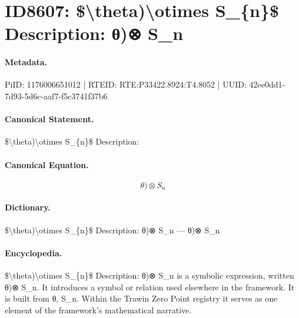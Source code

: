 \section*{ID8607: \$\textbackslash{}theta)\textbackslash{}otimes S\_\{n\}\$ Description: θ)⊗ S\_n}
\paragraph{Metadata.}
PiID: 1176006651012 | RTEID: RTE:P33422.8924:T4.8052 | UUID: 42ee0dd1-7d93-5d6c-aaf7-f5c3741f37b6

\paragraph{Canonical Statement.}
\$\textbackslash{}theta)\textbackslash{}otimes S\_\{n\}\$ Description:

\paragraph{Canonical Equation.}
\[
\theta)\otimes S_{n}
\]

\paragraph{Dictionary.}
\$\textbackslash{}theta)\textbackslash{}otimes S\_\{n\}\$ Description: θ)⊗ S\_n — θ)⊗ S\_n

\paragraph{Encyclopedia.}
\$\textbackslash{}theta)\textbackslash{}otimes S\_\{n\}\$ Description: θ)⊗ S\_n is a symbolic expression, written θ)⊗ S\_n. It introduces a symbol or relation used elsewhere in the framework. It is built from θ, S\_n. Within the Trawin Zero Point registry it serves as one element of the framework's mathematical narrative.
